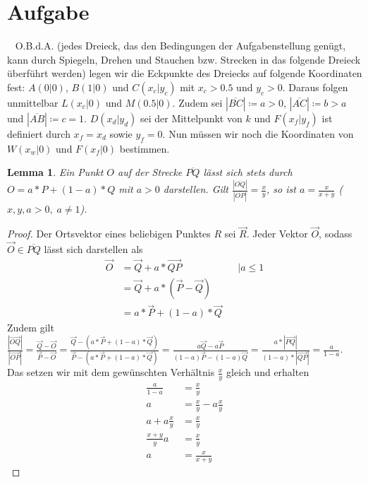 \documentclass{article}
\newtheorem{lemma}{Lemma}
\newcommand{\strecke}[1]{\left|\overline{#1}\right|}
\begin{document}
    \section{Aufgabe}
    \ \newline
    O.B.d.A. (jedes Dreieck, das den Bedingungen der Aufgabenstellung genügt, kann durch Spiegeln, Drehen und Stauchen bzw. Strecken in das folgende Dreieck überführt werden) legen wir die Eckpunkte des Dreiecks auf folgende Koordinaten fest: $A(0|0)$, $B(1|0)$ und $C(x_c|y_c)$ mit $x_c> 0.5$ und $y_c> 0$. Daraus folgen unmittelbar $L(x_c|0)$ und $M(0.5|0)$. 
    Zudem sei $\strecke{BC}\coloneqq a>0$, $\strecke{AC}\coloneqq b>a$ und $\strecke{AB}\coloneqq c = 1$.
    $D(x_d|y_d)$ sei der Mittelpunkt von $k$ und $F(x_f|y_f)$ ist definiert durch $x_f = x_d$ sowie $y_f = 0$.
    Nun müssen wir noch die Koordinaten von $W(x_w|0)$ und $F(x_f|0)$ bestimmen.
    \begin{lemma}
    	Ein Punkt $O$ auf der Strecke $\overline{PQ}$ lässt sich stets durch $O = a*P+(1-a)*Q$ mit $a>0$ darstellen.
    	Gilt $\frac{\strecke{OQ}}{\strecke{OP}} = \frac{x}{y}$, so ist $a = \frac{x}{x+y}$ ($x, y, a>0,\; a \neq 1$).
    \end{lemma}
	\begin{proof}
		Der Ortsvektor eines beliebigen Punktes $R$ sei $\vec{R}$. Jeder Vektor $\vec{O}$, sodass $\vec{O}\in \overline{PQ}$ lässt sich darstellen als 
		\begin{align*}
			\vec{O}&= \vec{Q} + a*\vec{QP}&&| a\leq 1\\
			&= \vec{Q} + a* (\vec{P} - \vec{Q})\\
			&= a*\vec{P}+(1-a)*\vec{Q}
		\end{align*}
		Zudem gilt $\frac{|\vec{OQ}|}{|\vec{OP}|} = \frac{\vec{Q}-\vec{O}}{\vec{P}-\vec{O}} = \frac{\vec{Q}-(a*\vec{P}+(1-a)*\vec{Q})}{\vec{P}-(a*\vec{P}+(1-a)*\vec{Q})} = \frac{a\vec{Q}-a\vec{P}}{(1-a)\vec{P}-(1-a)\vec{Q}} =  \frac{a*|\vec{PQ}|}{(1-a)*|\vec{QP}|} = \frac{a}{1-a}$. Das setzen wir mit dem gewünschten Verhältnis $\frac{x}{y}$ gleich und erhalten
		\begin{align*}
			\frac{a}{1-a} &= \frac{x}{y}\\
			a &= \frac{x}{y}- a\frac{x}{y}\\
			a + a\frac{x}{y}&=  \frac{x}{y}\\
			\frac{x+y}{y}a &= \frac{x}{y}\\
			a &= \frac{x}{x+y}
		\end{align*}
	\end{proof}
\end{document}

